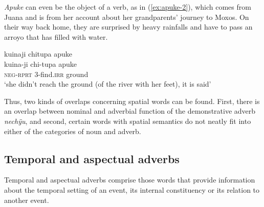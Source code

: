 \textit{Apuke} can even be the object of a verb, as in (\ref{ex:apuke-2}), which comes from Juana and is from her account about her grandparents’ journey to Moxos. On their way back home, they are surprised by heavy rainfalls and have to pass an arroyo that has filled with water.

\ea\label{ex:apuke-2}
\begingl
\glpreamble kuinaji chitupa apuke\\
\gla kuina-ji chi-tupa apuke\\
\glb \textsc{neg}-\textsc{rprt} 3-find.\textsc{irr} ground\\
\glft ‘she didn’t reach the ground (of the river with her feet), it is said’
\endgl
\trailingcitation{[jxx-p151016l-2.144]}
\xe




Thus, two kinds of overlaps concerning spatial words can be found. First, there is an overlap between nominal and adverbial function of the demonstrative adverb \textit{nechÿu}, and second, certain words with spatial semantics do not neatly fit into either of the categories of noun and adverb.



\subsection{Temporal and aspectual adverbs}\label{sec:TemporalAspectualAdverbs}

Temporal and aspectual adverbs comprise those words that provide information about the temporal setting of an event, its internal constituency or its relation to another event.

